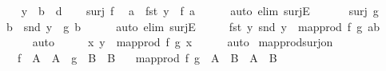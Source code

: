 \begin{isabellebody}
\isamarkupfalse%
\isanewline
\ \ \isamarkupfalse%
\ y\ {\isacharcolon}{\kern0pt}{\isacharcolon}{\kern0pt}\ {\isachardoublequoteopen}{\isacharprime}{\kern0pt}b\ {\isasymtimes}\ {\isacharprime}{\kern0pt}d{\isachardoublequoteclose}\isanewline
\ \ \isamarkupfalse%
\ {\isacartoucheopen}surj\ f{\isacartoucheclose}\ \isamarkupfalse%
\ a\ \ {\isachardoublequoteopen}fst\ y\ {\isacharequal}{\kern0pt}\ f\ a{\isachardoublequoteclose}\isanewline
\ \ \ \ \isamarkupfalse%
\ {\isacharparenleft}{\kern0pt}auto\ elim{\isacharcolon}{\kern0pt}\ surjE{\isacharparenright}{\kern0pt}\isanewline
\ \ \isamarkupfalse%
\isanewline
\ \ \isamarkupfalse%
\ {\isacartoucheopen}surj\ g{\isacartoucheclose}\ \isamarkupfalse%
\ b\ \ {\isachardoublequoteopen}snd\ y\ {\isacharequal}{\kern0pt}\ g\ b{\isachardoublequoteclose}\isanewline
\ \ \ \ \isamarkupfalse%
\ {\isacharparenleft}{\kern0pt}auto\ elim{\isacharcolon}{\kern0pt}\ surjE{\isacharparenright}{\kern0pt}\isanewline
\ \ \isamarkupfalse%
\ \isamarkupfalse%
\ {\isachardoublequoteopen}{\isacharparenleft}{\kern0pt}fst\ y{\isacharcomma}{\kern0pt}\ snd\ y{\isacharparenright}{\kern0pt}\ {\isacharequal}{\kern0pt}\ map{\isacharunderscore}{\kern0pt}prod\ f\ g\ {\isacharparenleft}{\kern0pt}a{\isacharcomma}{\kern0pt}b{\isacharparenright}{\kern0pt}{\isachardoublequoteclose}\isanewline
\ \ \ \ \isamarkupfalse%
\ auto\isanewline
\ \ \isamarkupfalse%
\ \isamarkupfalse%
\ {\isachardoublequoteopen}{\isasymexists}x{\isachardot}{\kern0pt}\ y\ {\isacharequal}{\kern0pt}\ map{\isacharunderscore}{\kern0pt}prod\ f\ g\ x{\isachardoublequoteclose}\isanewline
\ \ \ \ \isamarkupfalse%
\ auto\isanewline
{}\isamarkupfalse%
%
\endisatagproof
{\isafoldproof}%
%
\isadelimproof
\isanewline
%
\endisadelimproof
\isanewline
{}\isamarkupfalse%
\ map{\isacharunderscore}{\kern0pt}prod{\isacharunderscore}{\kern0pt}surj{\isacharunderscore}{\kern0pt}on{\isacharcolon}{\kern0pt}\isanewline
\ \ \ {\isachardoublequoteopen}f\ {\isacharbackquote}{\kern0pt}\ A\ {\isacharequal}{\kern0pt}\ A{\isacharprime}{\kern0pt}{\isachardoublequoteclose}\ \ {\isachardoublequoteopen}g\ {\isacharbackquote}{\kern0pt}\ B\ {\isacharequal}{\kern0pt}\ B{\isacharprime}{\kern0pt}{\isachardoublequoteclose}\isanewline
\ \ \ {\isachardoublequoteopen}map{\isacharunderscore}{\kern0pt}prod\ f\ g\ {\isacharbackquote}{\kern0pt}\ {\isacharparenleft}{\kern0pt}A\ {\isasymtimes}\ B{\isacharparenright}{\kern0pt}\ {\isacharequal}{\kern0pt}\ A{\isacharprime}{\kern0pt}\ {\isasymtimes}\ B{\isacharprime}{\kern0pt}{\isachardoublequoteclose}\isanewline

\end{isabellebody}
